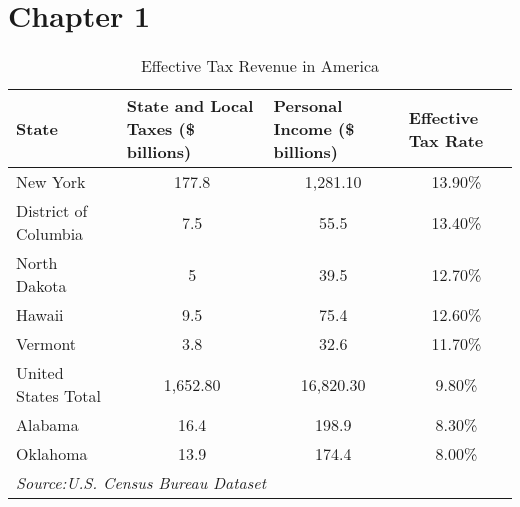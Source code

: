 
\section{Chapter 1}

\begin{table}[H]
    \centering
    \caption{Effective Tax Revenue in America}
    \begin{tabular}{p{9.43em}lll}
        \toprule
        State                & \multicolumn{1}{p{8.145em}}{State and Local Taxes (\$ billions)} & \multicolumn{1}{p{7.43em}}{Personal Income (\$ billions)} & \multicolumn{1}{p{9.93em}}{Effective Tax Rate} \\
        \midrule
        New York             & \multicolumn{1}{c}{177.8}                                        & \multicolumn{1}{c}{1,281.10}                              & \multicolumn{1}{c}{13.90\%}                    \\
        District of Columbia & \multicolumn{1}{c}{7.5}                                          & \multicolumn{1}{c}{55.5}                                  & \multicolumn{1}{c}{13.40\%}                    \\
        North Dakota         & \multicolumn{1}{c}{5}                                            & \multicolumn{1}{c}{39.5}                                  & \multicolumn{1}{c}{12.70\%}                    \\
        Hawaii               & \multicolumn{1}{c}{9.5}                                          & \multicolumn{1}{c}{75.4}                                  & \multicolumn{1}{c}{12.60\%}                    \\
        Vermont              & \multicolumn{1}{c}{3.8}                                          & \multicolumn{1}{c}{32.6}                                  & \multicolumn{1}{c}{11.70\%}                    \\
        \midrule
        United States Total  & \multicolumn{1}{c}{1,652.80}                                     & \multicolumn{1}{c}{16,820.30}                             & \multicolumn{1}{c}{9.80\%}                     \\
        \midrule
        Alabama              & \multicolumn{1}{c}{16.4}                                         & \multicolumn{1}{c}{198.9}                                 & \multicolumn{1}{c}{8.30\%}                     \\
        Oklahoma             & \multicolumn{1}{c}{13.9}                                         & \multicolumn{1}{c}{174.4}                                 & \multicolumn{1}{c}{8.00\%}                     \\
        \midrule
        \multicolumn{4}{p{34.935em}}{\textit{Source:U.S. Census Bureau Dataset}}                                                                                                                             \\
    \end{tabular}%
    \label{Table 1.1}%
\end{table}%

